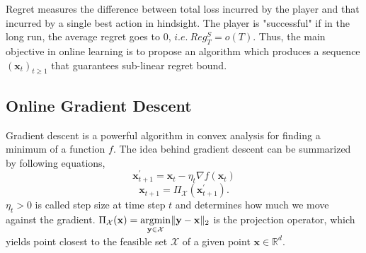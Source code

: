 \documentclass[12pt, a4paper]{report}
\begin{document}
Regret measures the difference between total loss incurred by the player and that incurred by a single best action in hindsight. The player is "successful" if in the long run, the average regret goes to 0, $i.e.\ Reg_{T}^S = o(T)$.
Thus, the main objective in online learning is to propose an algorithm which produces a sequence $(\mathbf{x}_t)_{t \geq 1}$ that guarantees sub-linear regret bound.



\subsection{Online Gradient Descent}
Gradient descent is a powerful algorithm in convex analysis for finding a minimum of a function $f$. The idea behind gradient descent can be summarized by following equations,
\begin{equation*}
    \mathbf{x}_{t+1}^\prime = \mathbf{x}_t - \eta_t \nabla f(\mathbf{x}_t)
\end{equation*}
\begin{equation*}
    \mathbf{x}_{t+1} = \Pi_\mathcal{X} (\mathbf{x}_{t+1}^\prime).
\end{equation*}    
$\eta_t > 0$ is called step size at time step $t$ and determines how much we move against the gradient. $\displaystyle \Pi_\mathcal{X}(\mathbf{x}) = \operatorname*{argmin}_{\mathbf{y} \in \mathcal{X}} \lVert \mathbf{y} - \mathbf{x} \rVert_{2}$ is the projection operator, which yields point closest to the feasible set $\mathcal{X}$ of a given point $\mathbf{x} \in \mathbb{R}^d$. 
\end{document}
